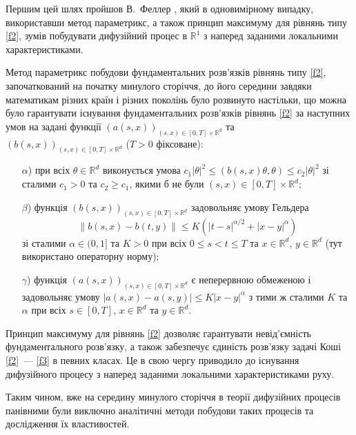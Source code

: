 \documentclass[11pt, reqno]{amsart}
\begin{document}
Першим цей шлях пройшов В.~Феллер \cite{b3}, який в одновимірному випадку, використавши метод параметрикс, а також принцип максимуму для рівнянь типу \eqref{f2}, зумів побудувати дифузійний процес в $\mathbb{R}^1$ з наперед заданими локальними характеристиками.

Метод параметрикс побудови фундаментальних розв'язків рівнянь типу \eqref{f2}, започаткований на початку минулого сторіччя, до його середини завдяки математикам різних країн і різних поколінь було розвинуто настільки, що можна було гарантувати існування фундаментальних розв'язків рівнянь \eqref{f2} за наступних умов на задані функції $(a(s,x))_{(s,x)\in[0,T]\times\mathbb{R}^d}$ та $(b(s,x))_{(s,x)\in[0,T]\times\mathbb{R}^d}$ ($T>0$ фіксоване):
\begin{enumerate}
	\item[$\alpha$)] при всіх $\theta\in\mathbb{R}^d$ виконується умова $c_1|\theta|^2\le(b(s,x)\theta,\theta)\le c_2|\theta|^2$ зі сталими $c_1>0$ та $c_2\ge c_1$, якими б не були $(s,x)\in[0,T]\times\mathbb{R}^d$;
	\item[$\beta$)] функція $(b(s,x))_{(s,x)\in[0,T]\times\mathbb{R}^d}$ задовольняє умову Гельдера $$\|b(s,x)-b(t,y)\|\le K\left(|t-s|^{\alpha/2}+|x-y|^\alpha\right)$$ зі сталими $\alpha\in(0,1]$ та $K>0$ при всіх $0\le s<t\le T$ та $x\in\mathbb{R}^d$, $y\in\mathbb{R}^d$ (тут використано операторну норму);
	\item[$\gamma$)] функція $(a(s,x))_{(s,x)\in[0,T]\times\mathbb{R}^d}$ є неперервною обмеженою і задовольняє умову $|a(s,x)-a(s,y)|\le K|x-y|^\alpha$ з тими ж сталими $K$ та $\alpha$ при всіх $s\in[0,T]$, $x\in\mathbb{R}^d$ та $y\in\mathbb{R}^d$.
\end{enumerate}

Принцип максимуму для рівнянь \eqref{f2} дозволяє гарантувати не\-від'\-єм\-ність фундаментального роз\-в'\-яз\-ку, а також забезпечує єдиність роз\-в'\-яз\-ку задачі Коші \eqref{f2}~--- \eqref{f3} в певних класах. Це в свою чергу приводило до існування дифузійного процесу з наперед заданими локальними характеристиками руху.

Таким чином, вже на середину минулого сторіччя в теорії дифузійних процесів панівними були виключно аналітичні методи побудови таких процесів та дослідження їх властивостей.
\end{document}
